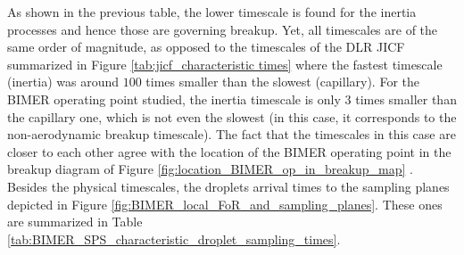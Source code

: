 As shown in the previous table, the lower timescale is found for the inertia processes and hence those are governing breakup. Yet, all timescales are of the same order of magnitude, as opposed to the timescales of the DLR JICF summarized in Figure \ref{tab:jicf_characteristic times} where the fastest timescale (inertia) was around $100$ times smaller than the slowest (capillary). For the BIMER operating point studied, the inertia timescale is only $3$ times smaller than the capillary one, which is not even the slowest (in this case, it corresponds to the non-aerodynamic breakup timescale). The fact that the timescales in this case are closer to each other agree with the location of the BIMER operating point in the breakup diagram of Figure \ref{fig:location_BIMER_op_in_breakup_map} . Besides the physical timescales, the droplets arrival times to the sampling planes depicted in Figure \ref{fig:BIMER_local_FoR_and_sampling_planes}. These ones are summarized in Table \ref{tab:BIMER_SPS_characteristic_droplet_sampling_times}. 







